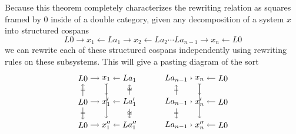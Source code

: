 \documentclass{amsart}
\renewcommand{\gets}{\leftarrow}
\theoremstyle{remark}
\theoremstyle{definition}
\begin{document}
Because this theorem completely characterizes the rewriting relation
as squares framed by $ 0 $ inside of a double category, given any
decomposition of a system $ x $ into structured cospans
%
\[
  L0 \to x_1 \gets La_1 \to x_2 \gets La_2 \dotsm La_{n-1} \to x_n
  \gets L0
\]
%
we can rewrite each of these structured cospans independently using
rewriting rules on these subsystems. This will give a pasting diagram
of the sort
%
\[
  \begin{tikzpicture}
    \begin{scope}[shift={(0,4)}]
      \node (1) at (0,2) {$ L0 $};
      \node (2) at (1,2) {$ x_1 $};
      \node (3) at (2,2) {$ La_1 $};
      \node (4) at (0,1) {$ L0 $};
      \node (5) at (1,1) {$ x'_1 $};
      \node (6) at (2,1) {$ La'_1 $};
      \node (7) at (0,0) {$ L0 $};
      \node (8) at (1,0) {$ x''_1 $};
      \node (9) at (2,0) {$ La''_1 $};
      \draw [->] (1) to node [] {\scriptsize{$  $}} (2);
      \draw [->] (3) to node [] {\scriptsize{$  $}} (2);
      \draw [->] (4) to node [] {\scriptsize{$  $}} (5);
      \draw [->] (6) to node [] {\scriptsize{$  $}} (5);
      \draw [->] (7) to node [] {\scriptsize{$  $}} (8);
      \draw [->] (9) to node [] {\scriptsize{$  $}} (8);
      \draw [->] (4) to node [] {\scriptsize{$ = $}} (1);
      \draw [->] (4) to node [] {\scriptsize{$ = $}} (7);
      \draw [>->] (2) to node [] {\scriptsize{$  $}} (5);
      \draw [->] (2) to node [] {\scriptsize{$  $}} (8);
      \draw [->] (6) to node [] {\scriptsize{$ \cong  $}} (3);
      \draw [->] (6) to node [] {\scriptsize{$ \cong $}} (9);
    \end{scope}
    \begin{scope}[shift={(4,4)}]
      \node (1) at (0,2) {$ La_{n-1} $};
      \node (2) at (1,2) {$ x_n $};
      \node (3) at (2,2) {$ L0 $};
      \node (4) at (0,1) {$ La_{n-1} $};
      \node (5) at (1,1) {$ x'_n $};
      \node (6) at (2,1) {$ L0 $};
      \node (7) at (0,0) {$ La_{n-1} $};
      \node (8) at (1,0) {$ x''_n $};
      \node (9) at (2,0) {$ L0 $};
       \draw [->] (1) to node [] {\scriptsize{$  $}} (2);
      \draw [->] (3) to node [] {\scriptsize{$  $}} (2);
      \draw [->] (4) to node [] {\scriptsize{$  $}} (5);
      \draw [->] (6) to node [] {\scriptsize{$  $}} (5);
      \draw [->] (7) to node [] {\scriptsize{$  $}} (8);
      \draw [->] (9) to node [] {\scriptsize{$  $}} (8);
      \draw [->] (4) to node [] {\scriptsize{$ = $}} (1);
      \draw [->] (4) to node [] {\scriptsize{$ = $}} (7);
      \draw [>->] (2) to node [] {\scriptsize{$  $}} (5);
      \draw [->] (2) to node [] {\scriptsize{$  $}} (8);

\end{scope}
\end{tikzpicture}\]
\end{document}
